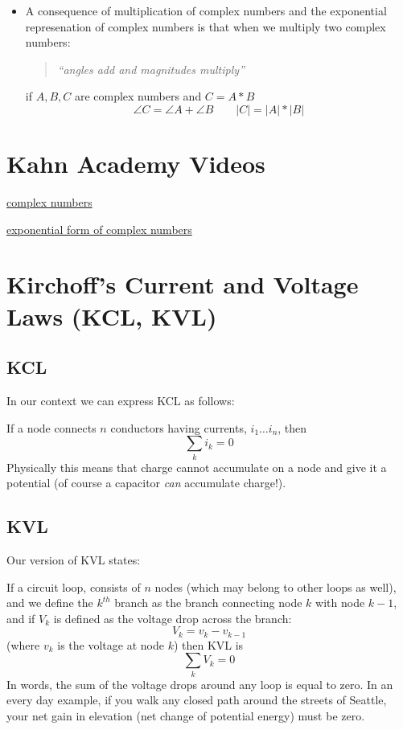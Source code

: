 \begin{itemize}
  \item A consequence of multiplication of complex numbers and the exponential represenation of complex numbers is that when we multiply two complex numbers:
     \begin{quotation} {\it ``angles add and magnitudes multiply''}
     \end{quotation}
   if $A,B,C$ are complex numbers and $C = A * B$
   \[
    \angle{C} = \angle{A}+\angle{B}  \qquad   |C| = |A|*|B|
   \]


\end{itemize}

\section{Kahn Academy Videos}\label{KahnV}

\href{https://www.khanacademy.org/math/algebra/complex-numbers/complex_numbers/v/complex-numbers}{complex numbers}

\href{https://www.khanacademy.org/math/trigonometry/imaginary_complex_precalc/complex_analysis/v/exponential-form-to-find-complex-roots}{exponential form of complex numbers}








\section{Kirchoff's Current and Voltage Laws (KCL, KVL)}

\subsection{KCL}
In our context we can express KCL as follows:

If a node connects $n$ conductors having currents, $i_1 \dots i_n$,
then
\[
\sum_k i_k = 0
\]
Physically this means that charge cannot accumulate on a node and give it a
potential (of course a capacitor {\it can} accumulate charge!).

\subsection{KVL}
Our version of KVL states:

If a circuit loop, consists of $n$ nodes (which may belong to other loops as well),
and we define the $k^{th}$ branch as the branch connecting node $k$ with node $k-1$, and if $V_k$ is defined as the voltage drop across the branch:
\[
V_k = v_k - v_{k-1}
\]
(where $v_k$ is the voltage at node $k$)
then KVL is
\[
\sum_k V_k = 0
\]
In words, the sum of the voltage drops around any loop is equal to zero. In an
every day example, if you walk any closed path around the streets of Seattle,
your net gain in elevation (net change of potential energy) must be zero.

